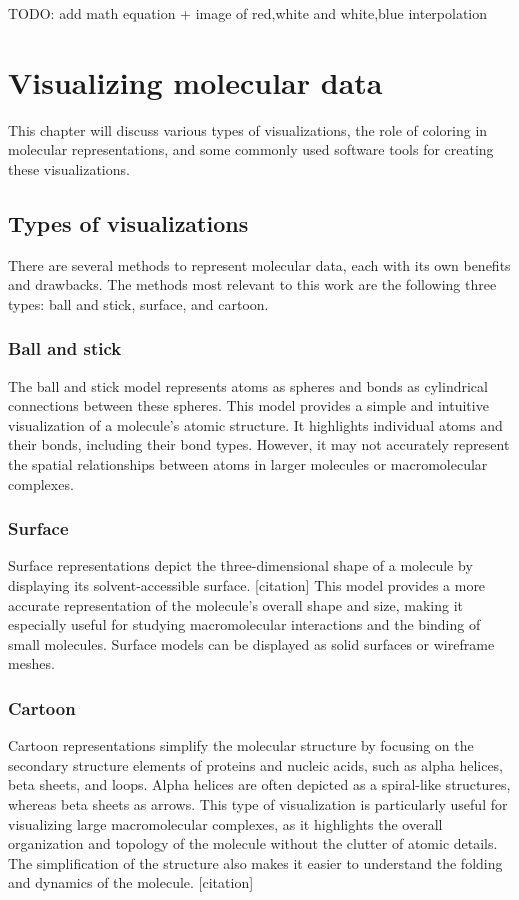\documentclass[
  digital,     %
  oneside,     %
  nosansbold,  %
  nocolorbold, %
  lof,         %
  lot,         %
]{fithesis4}
\begin{document}
TODO: add math equation + image of red,white and white,blue interpolation

\chapter{Visualizing molecular data}
This chapter will discuss various types of visualizations, the role of coloring in molecular representations, and some commonly used software tools for creating these visualizations.

\section{Types of visualizations}
There are several methods to represent molecular data, each with its own benefits and drawbacks. The methods most relevant to this work are the following three types: ball and stick, surface, and cartoon.

\subsection{Ball and stick}
The ball and stick model represents atoms as spheres and bonds as cylindrical connections between these spheres. This model provides a simple and intuitive visualization of a molecule's atomic structure. It highlights individual atoms and their bonds, including their bond types. However, it may not accurately represent the spatial relationships between atoms in larger molecules or macromolecular complexes.

\subsection{Surface}
Surface representations depict the three-dimensional shape of a molecule by displaying its solvent-accessible surface. [citation] This model provides a more accurate representation of the molecule's overall shape and size, making it especially useful for studying macromolecular interactions and the binding of small molecules. Surface models can be displayed as solid surfaces or wireframe meshes.

\subsection{Cartoon}
Cartoon representations simplify the molecular structure by focusing on the secondary structure elements of proteins and nucleic acids, such as alpha helices, beta sheets, and loops. Alpha helices are often depicted as a spiral-like structures, whereas beta sheets as arrows. This type of visualization is particularly useful for visualizing large macromolecular complexes, as it highlights the overall organization and topology of the molecule without the clutter of atomic details. The simplification of the structure also makes it easier to understand the folding and dynamics of the molecule. [citation]
\end{document}
